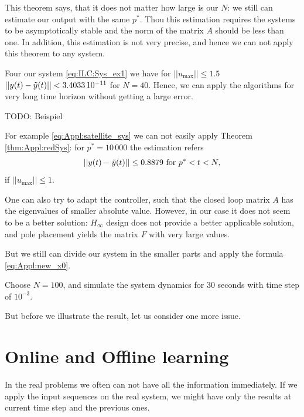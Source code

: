	This theorem says, that it does not matter how large is our $N$: we still can estimate our output with the same $p^*$. 
	Thou this estimation requires the systems to be asymptotically stable and the norm of the matrix $A$ should be less than one. In addition, this estimation is not very precise, and hence we can not apply this theorem to any system. 
	
	\begin{exam}
		Four our system \eqref{eq:ILC:Sys_ex1} we have for $||u_{\max}||\leq 1.5$ 
		$||y(t) - \tilde{y}(t)|| < 3.4033\, 10^{-11}$ for $N = 40$. Hence, we can apply the algorithms for very long time horizon without getting a large error. 
		
		TODO: Beispiel 
		
	\end{exam}

\begin{exam}
	\label{ex:Appl:redN}
	For example \eqref{eq:Appl:satellite_sys} we can not easily apply Theorem \ref{thm:Appl:redSys}: for $p^* = 10 \, 000 $ the estimation refers 
	\begin{align}
	||y(t) - \tilde{y}(t)|| \leq 0.8879 \text{ for } p^* < t < N,
	\end{align}
	if $||u_{\max}|| \leq 1$.
	
	One can also try to adapt the controller, such that the closed loop matrix $A$ has the eigenvalues of smaller absolute value. However, in our case it does not seem to be a better solution: $H_\infty$ design does not provide a better applicable solution, and pole placement yields the matrix $F$ with very large values. 
	
	But we still can divide our system in the smaller parts and apply the formula \eqref{eq:Appl:new_x0}. 
	
	Choose $N = 100$, and simulate the system dynamics for 30 seconds with time step of $10^{-3}$. 

But before we illustrate the result, let us consider one more issue. 
	
	
\end{exam}

\section{Online and Offline learning}

In the real problems we often can not have all the information immediately. If we apply the input sequences on the real system, we might have only the results at current time step and the previous ones. 

